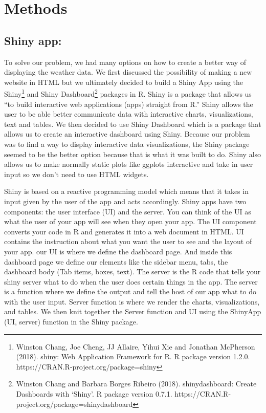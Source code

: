 \documentclass[10pt,letterpaper]{article}
\begin{document}
\section{Methods}\label{methods}

\subsection{Shiny app:}\label{shiny-app}

To solve our problem, we had many options on how to create a better way
of displaying the weather data. We first discussed the possibility of
making a new website in HTML but we ultimately decided to build a Shiny
App using the Shiny\footnote{Winston Chang, Joe Cheng, JJ Allaire, Yihui
  Xie and Jonathan McPherson (2018). shiny: Web Application Framework
  for R. R package version 1.2.0.
  https://CRAN.R-project.org/package=shiny} and Shiny
Dashboard\footnote{Winston Chang and Barbara Borges Ribeiro (2018).
  shinydashboard: Create Dashboards with `Shiny'. R package version
  0.7.1. https://CRAN.R-project.org/package=shinydashboard} packages in
R. Shiny is a package that allows us ``to build interactive web
applications (apps) straight from R.'' Shiny allows the user to be able
better communicate data with interactive charts, visualizations, text
and tables. We then decided to use Shiny Dashboard which is a package
that allows us to create an interactive dashboard using Shiny. Because
our problem was to find a way to display interactive data
visualizations, the Shiny package seemed to be the better option because
that is what it was built to do. Shiny also allows us to make normally
static plots like ggplots interactive and take in user input so we don't
need to use HTML widgets.

Shiny is based on a reactive programming model which means that it takes
in input given by the user of the app and acts accordingly. Shiny apps
have two components: the user interface (UI) and the server. You can
think of the UI as what the user of your app will see when they open
your app. The UI component converts your code in R and generates it into
a web document in HTML. UI contains the instruction about what you want
the user to see and the layout of your app. our UI is where we define
the dashboard page. And inside this dashboard page we define our
elements like the sidebar menu, tabs, the dashboard body (Tab items,
boxes, text). The server is the R code that tells your shiny server what
to do when the user does certain things in the app. The server is a
function where we define the output and tell the host of our app what to
do with the user input. Server function is where we render the charts,
visualizations, and tables. We then knit together the Server function
and UI using the ShinyApp (UI, server) function in the Shiny package.
\end{document}
